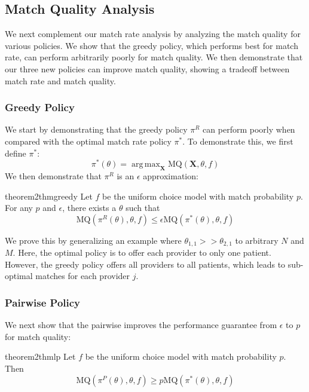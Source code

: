 \documentclass[11pt]{article}
\DeclareMathOperator*{\argmax}{arg\,max}
\begin{document}
\subsection{Match Quality Analysis}
\label{sec:match_quality}
We next complement our match rate analysis by analyzing the match quality for various policies.
We show that the greedy policy, which performs best for match rate, can perform arbitrarily poorly for match quality.
We then demonstrate that our three new policies can improve match quality, showing a tradeoff between match rate and match quality. 

\subsubsection{Greedy Policy}
We start by demonstrating that the greedy policy $\pi^{R}$ can perform poorly when compared with the optimal match rate policy $\pi^{*}$. 
To demonstrate this, we first define $\pi^{*}$: 
\begin{equation}
    \pi^{*}(\theta) = \argmax_{\mathbf{X}} \mathrm{MQ}(\mathbf{X},\theta,f)
\end{equation}
We then demonstrate that $\pi^{R}$ is an $\epsilon$ approximation:

\begin{restatable}{theorem2}{thmgreedy}
    \label{thm:greedy}
    Let $f$ be the uniform choice model with match probability $p$. 
    For any $p$ and $\epsilon$, there exists a $\theta$ such that 
    \begin{equation}
        \mathrm{MQ}(\pi^{R}(\theta),\theta,f)  \leq \epsilon \mathrm{MQ}(\pi^{*}(\theta),\theta,f)
    \end{equation}
\end{restatable}

We prove this by generalizing an example where $\theta_{1,1} >> \theta_{2,1}$ to arbitrary $N$ and $M$. 
Here, the optimal policy is to offer each provider to only one patient. 
However, the greedy policy offers all providers to all patients, which leads to sub-optimal matches for each provider $j$. 

\subsubsection{Pairwise Policy}
We next show that the pairwise improves the performance guarantee from $\epsilon$ to $p$ for match quality: 

\begin{restatable}{theorem2}{thmlp}
\label{thm:lp}
    Let $f$ be the uniform choice model with match probability $p$. 
    Then 
    \begin{equation}
        \mathrm{MQ}(\pi^{P}(\theta),\theta,f) \geq p \mathrm{MQ}(\pi^{*}(\theta),\theta,f) 
    \end{equation}
\end{restatable}
\end{document}
